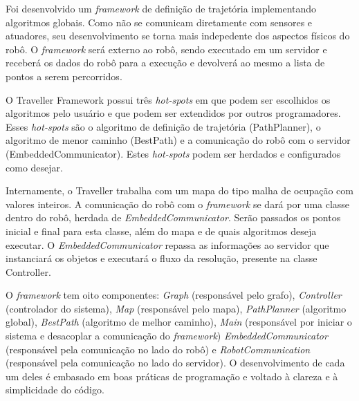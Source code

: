 Foi desenvolvido um \textit{framework} de definição de trajetória implementando algoritmos globais. Como não se comunicam diretamente com sensores e atuadores, seu desenvolvimento se torna mais indepedente dos aspectos físicos do robô. O \textit{framework} será externo ao robô, sendo executado em um servidor e receberá os dados do robô para a execução e devolverá ao mesmo a lista de pontos a serem percorridos.

O Traveller Framework possui três \textit{hot-spots} em que podem ser escolhidos os algoritmos pelo usuário e que podem ser extendidos por outros programadores. Esses \textit{hot-spots} são o algoritmo de definição de trajetória (PathPlanner), o algoritmo de menor caminho (BestPath) e a comunicação do robô com o servidor (EmbeddedCommunicator). Estes \textit{hot-spots} podem ser herdados e configurados como desejar.

Internamente, o Traveller trabalha com um mapa do tipo malha de ocupação com valores inteiros. A comunicação do robô com o \textit{framework} se dará por uma classe dentro do robô, herdada de \textit{EmbeddedCommunicator}. Serão passados os pontos inicial e final para esta classe, além do mapa e de quais algoritmos deseja executar. O \textit{EmbeddedCommunicator} repassa as informações ao servidor que instanciará os objetos e executará o fluxo da resolução, presente na classe Controller.

O \textit{framework} tem oito componentes: \textit{Graph} (responsável pelo grafo), \textit{Controller} (controlador do sistema), \textit{Map} (responsável pelo mapa), \textit{PathPlanner} (algoritmo global), \textit{BestPath} (algoritmo de melhor caminho),  \textit{Main} (responsável por iniciar o sistema e desacoplar a comunicação do \textit{framework}) \textit{EmbeddedCommunicator} (responsável pela comunicação no lado do robô) e \textit{RobotCommunication} (responsável pela comunicação no lado do servidor). O desenvolvimento de cada um deles é embasado em boas práticas de programação e voltado à clareza e à simplicidade do código.